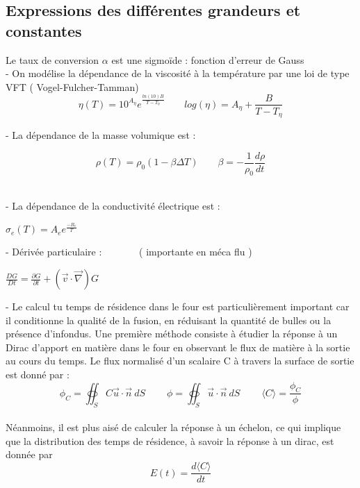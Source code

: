 \documentclass[12pt, a4paper, french, BCOR = 0pt, DIV = 10]{scrartcl}
\begin{document}
	\subsection{ Expressions des différentes grandeurs et constantes}
	Le taux de conversion $\alpha$ est une sigmoïde : fonction d'erreur de Gauss\\ [0.3cm]
	
	- On modélise la dépendance de la viscosité à la température par une loi de type VFT ( Vogel-Fulcher-Tamman) \\ [0.5 cm]
	
	\centering
	$$
	\eta (T)  = 10^{A_{\eta}} e^{\frac{ln(10) B}{T-T_{\eta}}} ~~~~~~~~~ log(\eta) = A_{\eta} + \frac{B}{T-T_{\eta}}
	$$
	
	
	\raggedright
	- La dépendance de la masse volumique est : \\ [0.5 cm]
	\begin{center}
		
		
		$$
		\rho(T) = \rho_{0}  (1 - \beta \Delta T) ~~~~~~~~~ 
		\beta = -\frac{1}{\rho_{0}} \frac{d\rho}{dt}
		$$
		\\
	\end{center}
	
	
	
	- La dépendance de la conductivité électrique est : \\ [0.5 cm]
	\begin{center}
		$ 
		\sigma_{e} (T) =  A_{e} e^{\frac{-B_{e}}{T}}
		$
	\end{center}
	
	- Dérivée particulaire : ~~~~~~~( importante en méca flu )\\
	
	\begin{center}
		$ \frac{DG}{Dt}=\frac{\partial G}{\partial t} + (\vec {v} \cdot \vec {\nabla } ) G
		$ \\    
	\end{center}
	
	
	
	- Le calcul tu temps de résidence dans le four est particulièrement important car il conditionne la qualité de la fusion, en réduisant la quantité de bulles ou la présence d'infondus. Une première méthode consiste à étudier la réponse à un Dirac d'apport en matière dans le four en observant le flux de matière à la sortie au cours du temps. Le flux normalisé d'un scalaire C à travers la surface de sortie est donné par :\\[0.3 cm]
	$$
	\phi_{C} =  \oiint_S C\vec{u} \cdot \vec{n}~dS  ~~~~~~~~~~ \phi = \oiint_S \vec{u} \cdot \vec{n}~dS  ~~~~~~~~~~
	\langle C \rangle = \frac{\phi_{C}}{\phi}
	$$ 
	\\ [0.5 cm]
	Néanmoins, il est plus aisé de calculer la réponse à un échelon, ce qui implique que la distribution des temps de résidence, à savoir la réponse à un dirac, est donnée par \[E(t)=\frac{d\langle C \rangle}{dt}\]
	
\end{document}
